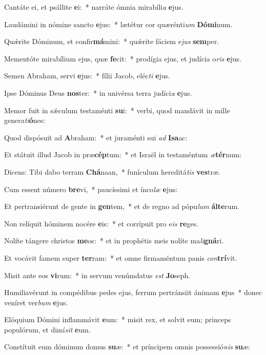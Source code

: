 \item Cantáte ei, et psállite \textbf{e}i:~* narráte ómnia mirabíli\textit{a} \textbf{e}jus.
\item Laudámini in nómine sancto \textbf{e}jus:~* lætétur cor quærénti\textit{um} \textbf{Dó}\textbf{mi}num.
\item Quǽrite Dóminum, et confir\textbf{má}mini:~* quǽrite fáciem e\textit{jus} \textbf{sem}per.
\item Mementóte mirabílium ejus, quæ \textbf{fe}cit:~* prodígia ejus, et judícia o\textit{ris} \textbf{e}jus.
\item Semen Abraham, servi \textbf{e}jus:~* fílii Jacob, eléc\textit{ti} \textbf{e}jus.
\item Ipse Dóminus Deus \textbf{nos}ter:~* in univérsa terra judíci\textit{a} \textbf{e}jus.
\item Memor fuit in sǽculum testaménti \textbf{su}i:~* verbi, quod mandávit in mille genera\textit{ti}\textbf{ó}nes:
\item Quod dispósuit ad \textbf{A}braham:~* et juraménti sui \textit{ad} \textbf{I}\textbf{sa}ac:
\item Et státuit illud Jacob in præ\textbf{cép}tum:~* et Israël in testaméntum \textit{æ}\textbf{tér}num:
\item Dicens: Tibi dabo terram \textbf{Chá}naan,~* funículum hereditá\textit{tis} \textbf{ves}træ.
\item Cum essent número \textbf{bre}vi,~* paucíssimi et ínco\textit{læ} \textbf{e}jus:
\item Et pertransiérunt de gente in \textbf{gen}tem,~* et de regno ad pópu\textit{lum} \textbf{ál}\textbf{te}rum.
\item Non relíquit hóminem nocére \textbf{e}is:~* et corrípuit pro e\textit{is} \textbf{re}ges.
\item Nolíte tángere christos \textbf{me}os:~* et in prophétis meis nolíte ma\textit{li}\textbf{gná}ri.
\item Et vocávit famem super \textbf{ter}ram:~* et omne firmaméntum panis \textit{con}\textbf{trí}vit.
\item Misit ante eos \textbf{vi}rum:~* in servum venúmdatus \textit{est} \textbf{Jo}seph.
\item Humiliavérunt in compédibus pedes ejus, ferrum pertránsiit ánimam \textbf{e}jus~* donec veníret ver\textit{bum} \textbf{e}jus.
\item Elóquium Dómini inflammávit \textbf{e}um:~* misit rex, et solvit eum; princeps populórum, et dimí\textit{sit} \textbf{e}um.
\item Constítuit eum dóminum domus \textbf{su}æ:~* et príncipem omnis possessió\textit{nis} \textbf{su}æ:
